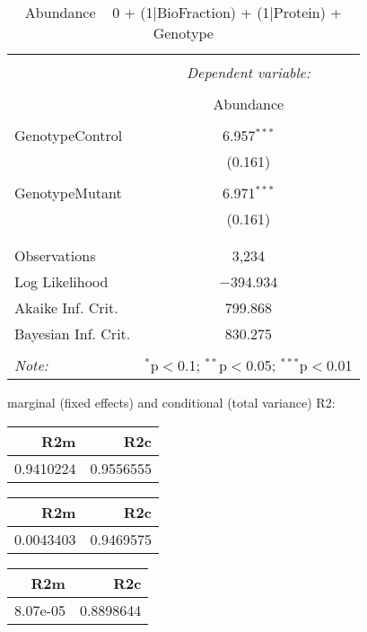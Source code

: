 \documentclass[11pt]{report}
\begin{document}
\begin{table}[!htbp] \centering 
  \caption{Abundance ~ 0 + (1|BioFraction) + (1|Protein) + Genotype} 
  \label{} 
\begin{tabular}{@{\extracolsep{5pt}}lc} 
\\[-1.8ex]\hline 
\hline \\[-1.8ex] 
 & \multicolumn{1}{c}{\textit{Dependent variable:}} \\ 
\cline{2-2} 
\\[-1.8ex] & Abundance \\ 
\hline \\[-1.8ex] 
 GenotypeControl & 6.957$^{***}$ \\ 
  & (0.161) \\ 
  & \\ 
 GenotypeMutant & 6.971$^{***}$ \\ 
  & (0.161) \\ 
  & \\ 
\hline \\[-1.8ex] 
Observations & 3,234 \\ 
Log Likelihood & $-$394.934 \\ 
Akaike Inf. Crit. & 799.868 \\ 
Bayesian Inf. Crit. & 830.275 \\ 
\hline 
\hline \\[-1.8ex] 
\textit{Note:}  & \multicolumn{1}{r}{$^{*}$p$<$0.1; $^{**}$p$<$0.05; $^{***}$p$<$0.01} \\ 
\end{tabular} 
\end{table} 
marginal (fixed effects) and conditional (total variance) R2:

\begin{tabular}{r|r}
\hline
R2m & R2c\\
\hline
0.9410224 & 0.9556555\\
\hline
\end{tabular}

\begin{tabular}{r|r}
\hline
R2m & R2c\\
\hline
0.0043403 & 0.9469575\\
\hline
\end{tabular}

\begin{tabular}{r|r}
\hline
R2m & R2c\\
\hline
8.07e-05 & 0.8898644\\
\hline
\end{tabular}
\end{document}
